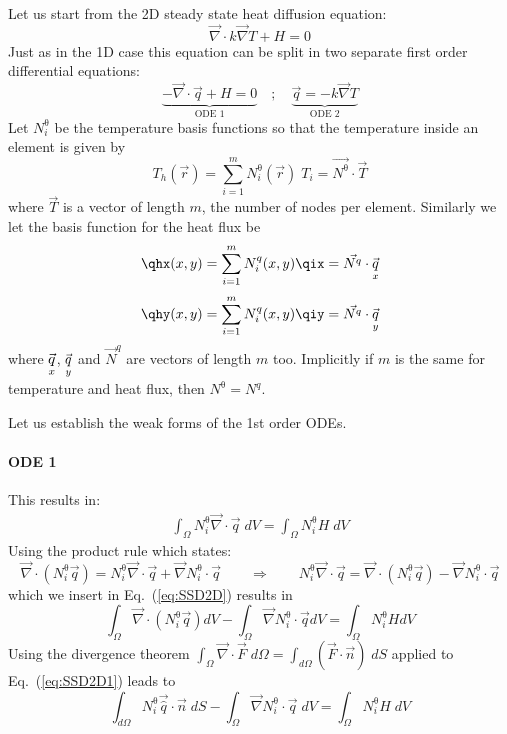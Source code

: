 
Let us start from the 2D steady state heat diffusion equation:
\begin{equation}
    \vec{\nabla} \cdot k \vec{\nabla} T + H=0
\end{equation}
Just as in the 1D case this equation can be split in two separate first order differential equations:
\begin{equation}
    \underbrace{-\vec{\nabla}\cdot \vec{q} + H=0}_{\text{ODE 1}} \quad ; \quad \underbrace{\vec{q}=-k\vec{\nabla } T}_{\text{ODE 2}}
\end{equation}
Let $N^\uptheta_i$ be the temperature basis functions so that the temperature inside an element is given by
\begin{equation}
T_h (\vec{r}) = \sum_{i=1}^m N_i^\uptheta (\vec{r}) \; T_i = \vec{N^\uptheta}\cdot \vec{T}
\end{equation}
where $\vec{T}$ is a vector of length $m$, the number of nodes per element. Similarly we let the basis function for the heat flux be
\begin{equation}
\qhx(x,y) = \sum_{i=1}^m N_i^q (x,y) \qix = \vec{N^q}\cdot \vec{\qx}
\end{equation}
\begin{equation}
\qhy(x,y) = \sum_{i=1}^m N_i^q (x,y) \qiy = \vec{N^q}\cdot \vec{\qy}
\end{equation}
where $\vec{\underset{\tiny x}{q}}$, $\vec{\underset{\tiny y}{q}}$ and $\vec{N}^q$ 
are vectors of length $m$ too. Implicitly if $m$ is the same for temperature and heat flux, then $N^\uptheta = N^q$.

Let us establish the weak forms of the 1st order ODEs. 


\paragraph{ODE 1} This results in:
\begin{eqnarray}
\int_\Omega {N^\uptheta_i} \vec{\nabla} \cdot \vec{q} \; dV = \int_\Omega {N^\uptheta_i} H \; dV
\label{eq:SSD2D}
\end{eqnarray}
Using the product rule which states:
\[
\vec{\nabla} \cdot ({N^\uptheta_i}\vec{q})={N^\uptheta_i}\vec{\nabla} \cdot \vec{q} 
+ \vec{\nabla}{N^\uptheta_i} \cdot \vec{q} 
\qquad
\Rightarrow
\qquad
{N^\uptheta_i}\vec{\nabla} \cdot \vec{q}=\vec{\nabla} \cdot ({N^\uptheta_i}\vec{q})- 
\vec{\nabla}{N^\uptheta_i} \cdot \vec{q}
\]
which we insert in Eq.~(\ref{eq:SSD2D}) results in 
\begin{equation}
\int_{\Omega} \vec{\nabla} \cdot ({N^\uptheta_i} \vec{q}) dV - 
\int_{\Omega} \vec{\nabla} {N^\uptheta_i} \cdot \vec{q} dV = \int_{\Omega} {N^\uptheta_i} H dV
\label{eq:SSD2D1}
\end{equation}
Using the divergence theorem 
$\int_\Omega \vec{\nabla} \cdot \vec{F} \; d\Omega = \int_{d\Omega}(\vec{F} \cdot \vec{n}) \; dS$ 
 applied to Eq.~(\ref{eq:SSD2D1}) leads to
\begin{equation}
\int_{d\Omega}{N^\uptheta_i} \vec{\hat{q}} \cdot \vec{n} \; dS  - 
\int_{\Omega} \vec{\nabla} {N^\uptheta_i} \cdot \vec{q} \; dV = 
\int_{\Omega} {N^\uptheta_i} H  \; dV
\end{equation}

